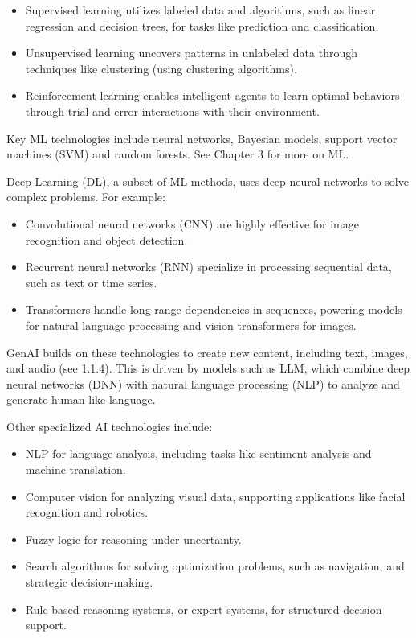 \documentclass[
  letterpaper,
  DIV=11,
  numbers=noendperiod,
  oneside]{scrreprt}
\begin{document}
\begin{tcolorbox}
\begin{itemize}
\item
  Supervised learning{} utilizes labeled data and algorithms, such as
  linear regression and decision trees, for tasks like prediction and
  classification.
\item
  Unsupervised learning{} uncovers patterns in unlabeled data through
  techniques like clustering (using clustering algorithms).
\item
  Reinforcement learning{} enables intelligent agents to learn optimal
  behaviors through trial-and-error interactions with their environment.
\end{itemize}

Key ML technologies include neural networks, Bayesian models, support
vector machines (SVM) and random forests. See Chapter 3 for more on ML.

Deep Learning (DL), a subset of ML methods, uses deep neural networks to
solve complex problems. For example:

\begin{itemize}
\item
  Convolutional neural networks (CNN) are highly effective for image
  recognition and object detection.
\item
  Recurrent neural networks (RNN) specialize in processing sequential
  data, such as text or time series.
\item
  Transformers handle long-range dependencies in sequences, powering
  models for natural language processing and vision transformers for
  images.
\end{itemize}

GenAI builds on these technologies to create new content, including
text, images, and audio (see 1.1.4). This is driven by models such as
LLM, which combine deep neural networks (DNN) with natural language
processing (NLP) to analyze and generate human-like language.

Other specialized AI technologies include:

\begin{itemize}
\item
  NLP for language analysis, including tasks like sentiment analysis and
  machine translation.
\item
  Computer vision for analyzing visual data, supporting applications
  like facial recognition and robotics.
\item
  Fuzzy logic for reasoning under uncertainty.
\item
  Search algorithms for solving optimization problems, such as
  navigation, and strategic decision-making.
\item
  Rule-based reasoning systems, or expert systems, for structured
  decision support.
\end{itemize}


\end{tcolorbox}
\end{document}
